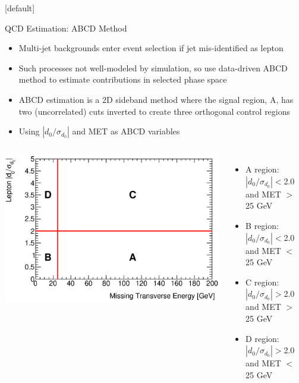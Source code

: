 \documentclass{beamer}
\newcommand*{\dsig}{\ensuremath{|d_{0}/\sigma_{d_{0}}|}\xspace}
\begin{document}
{  \makeatletter %
  [default]
  \def\beamer@entrycode{\vspace*{-1.075\headheight}}
  \begin{frame}{QCD Estimation: ABCD Method}
    \begin{itemize}\small
    \item Multi-jet backgrounds enter event selection if jet mis-identified as lepton
    \item Such processes not well-modeled by simulation, so use data-driven ABCD method to estimate contributions in selected phase space
    \item ABCD estimation is a 2D sideband method where the signal region, A, has two (uncorrelated) cuts inverted to create three orthogonal control regions
    \item Using \dsig and MET as ABCD variables
    \end{itemize}
    \begin{columns}
      \includegraphics[width=1.1\textwidth]{../chapters/dihiggs2/figures/abcdExample_met_vs_d0sigBL20} 
      \begin{itemize}\small
      \item A region: \dsig$<$2.0 and MET $>$ 25 GeV
      \item B region: \dsig$<$2.0 and MET $<$ 25 GeV
      \item C region: \dsig$>$2.0 and MET $>$ 25 GeV
      \item D region: \dsig$>$2.0 and MET $<$ 25 GeV
      \end{itemize}
    \end{columns}
  \end{frame}
  
}
\end{document}
